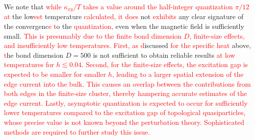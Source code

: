 \documentclass[twocolumn,superscriptaddress,showpacs, longbibliography, aps, prb]{revtex4-2}
\newcommand{\red}[1]{\textcolor{red}{#1}}
\begin{document}
We note that %
\red{while $\kappa_{xy}/T$ takes a value around the half-integer quantization $\pi/12$ at} the low\red{est} %
temperature %
\red{calculated, %
it does} not %
\red{exhibits} any clear signature of the 
convergenc\red{e %
t}o the %
\red{quantization,} even when the magnetic field is sufficiently small.
\red{This is presumably due to the finite bond dimension $D$, finite-size effects, and insufficiently low temperatures.} 
\red{First, %
as %
d}iscussed \red{for the specific heat} above\red{, %
t}he bond dimension $D=500$ is not sufficient
to obtain reliable results %
\red{at low temperatures for $h\lesssim0.04$}.
\red{Second, for the finite-size effects, the excitation gap is expected to be smaller for smaller $h$, leading to a larger spatial extension of the edge current into the bulk. 
This causes an overlap between the contributions from both edges in the finite-size cluster, thereby hampering accurate estimates of the edge current.} 
\red{Lastly, asymptotic quantization is expected to occur for sufficiently lower temperatures compared to the excitation gap of topological quasiparticles, whose precise value is not known beyond the perturbation theory. 
Sophisticated methods are required to further study this issue.} 
\end{document}
